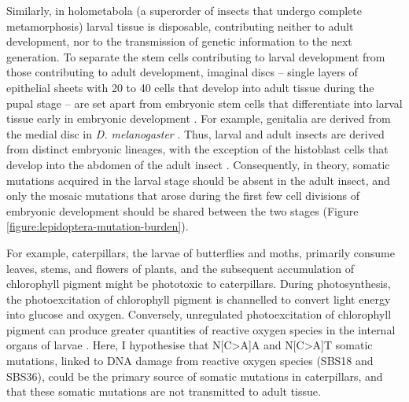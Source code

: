 Similarly, in holometabola (a superorder of insects that undergo complete metamorphosis) larval tissue is disposable, contributing neither to adult development, nor to the transmission of genetic information to the next generation. To separate the stem cells contributing to larval development from those contributing to adult development, imaginal discs – single layers of epithelial sheets with 20 to 40 cells that develop into adult tissue during the pupal stage – are set apart from embryonic stem cells that differentiate into larval tissue early in embryonic development \cite{Wieschaus1976}. For example, genitalia are derived from the medial disc in \textit{D. melanogaster} \cite{Bate1993}. Thus, larval and adult insects are derived from distinct embryonic lineages, with the exception of the histoblast cells that develop into the abdomen of the adult insect \cite{Bate1993}. Consequently, in theory, somatic mutations acquired in the larval stage should be absent in the adult insect, and only the mosaic mutations that arose during the first few cell divisions of embryonic development should be shared between the two stages (Figure \ref{figure:lepidoptera-mutation-burden}). 

For example, caterpillars, the larvae of butterflies and moths, primarily consume leaves, stems, and flowers of plants, and the subsequent accumulation of chlorophyll pigment might be phototoxic to caterpillars. During photosynthesis, the photoexcitation of chlorophyll pigment is channelled to convert light energy into glucose and oxygen. Conversely, unregulated photoexcitation of chlorophyll pigment can produce greater quantities of reactive oxygen species in the internal organs of larvae \cite{Foyer2018-in}. Here, I hypothesise that N[C>A]A and N[C>A]T somatic mutations, linked to DNA damage from reactive oxygen species (SBS18 and SBS36), could be the primary source of somatic mutations in caterpillars, and that these somatic mutations are not transmitted to adult tissue.  


